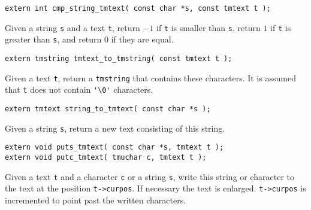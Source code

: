 \begin{verbatim}
extern int cmp_string_tmtext( const char *s, const tmtext t );
\end{verbatim}
\begin{desc}
Given a string \verb's' and a text \verb't', return $-1$ if \verb't' is
smaller than \verb's', return $1$ if \verb't' is greater than \verb's', and
return $0$ if they are equal. 
\end{desc}
\begin{verbatim}
extern tmstring tmtext_to_tmstring( const tmtext t );
\end{verbatim}
\begin{desc}
Given a text \verb't', return a \verb'tmstring' that contains these characters.
It is assumed that \verb't' does not contain \verb"'\0'" characters.
\end{desc}
\begin{verbatim}
extern tmtext string_to_tmtext( const char *s );
\end{verbatim}
\begin{desc}
Given a string \verb's', return a new text consisting of this string.
\end{desc}
\begin{verbatim}
extern void puts_tmtext( const char *s, tmtext t );
extern void putc_tmtext( tmuchar c, tmtext t );
\end{verbatim}
\begin{desc}
Given a text \verb't' and a character \verb'c' or a string \verb's', write
this string or character to the text at the position \verb't->curpos'.
If necessary the text is enlarged. \verb't->curpos' is incremented
to point past the written characters.
\end{desc}
